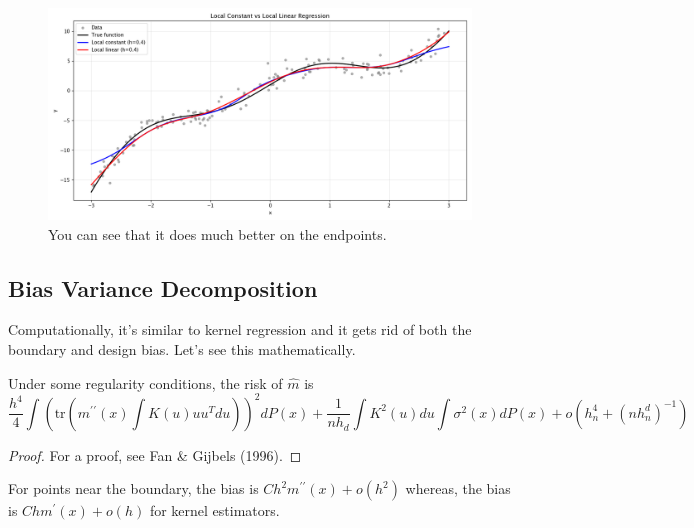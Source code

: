 \begin{example}
    \begin{figure}[H]
      \centering 
      \includegraphics[scale=0.4]{img/local_constant_vs_linear.png}
      \caption{You can see that it does much better on the endpoints.} 
    \end{figure}
  \end{example}

\subsection{Bias Variance Decomposition}

  Computationally, it's similar to kernel regression and it gets rid of both the boundary and design bias. Let's see this mathematically. 

  \begin{theorem}
    Under some regularity conditions, the risk of $\hat{m}$ is
    \begin{equation}
      \frac{h^4}{4} \int \left( \text{tr}(m^{\prime\prime}(x) \int K(u)uu^T du) \right)^2 dP(x) + \frac{1}{nh_d} \int K^2(u)du \int \sigma^2(x)dP(x) + o(h_n^4 + (nh_n^d)^{-1})
    \end{equation}
  \end{theorem}
  \begin{proof}
    For a proof, see Fan \& Gijbels (1996). 
  \end{proof}

  For points near the boundary, the bias is $Ch^2m^{\prime\prime}(x) + o(h^2)$ whereas, the bias is $Chm^{\prime}(x) + o(h)$ for kernel estimators.

